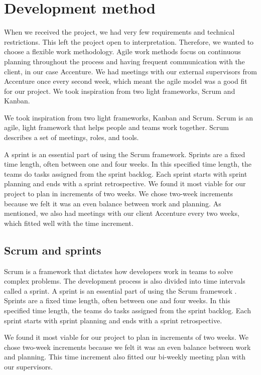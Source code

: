 \section{Development method}
When we received the project, we had very few requirements and technical restrictions. This left the project open to interpretation. Therefore, we wanted to choose a flexible work methodology. Agile work methods focus on continuous planning throughout the process and having frequent communication with the client, in our case Accenture. We had meetings with our external supervisors from Accenture once every second week, which meant the agile model was a good fit for our project. We took inspiration from two light frameworks, Scrum and Kanban.

We took inspiration from two light frameworks, Kanban and Scrum. Scrum is an agile,  light framework that helps people and teams work together. Scrum describes a set of meetings, roles, and tools. 

A sprint is an essential part of using the Scrum framework. Sprints are a fixed time length, often between one and four weeks. In this specified time length, the teams do tasks assigned from the sprint backlog. Each sprint starts with sprint planning and ends with a sprint retrospective. We found it most viable for our project to plan in increments of two weeks. We chose two-week increments because we felt it was an even balance between work and planning. As mentioned, we also had meetings with our client Accenture every two weeks, which fitted well with the time increment.   

\subsection{Scrum and sprints}
Scrum is a framework that dictates how developers work in teams to solve complex problems. The development process is also divided into time intervals called a sprint. A sprint is an essential part of using the Scrum framework \parencite{prosjektveilederen}. Sprints are a fixed time length, often between one and four weeks. In this specified time length, the teams do tasks assigned from the sprint backlog. Each sprint starts with sprint planning and ends with a sprint retrospective.

We found it most viable for our project to plan in increments of two weeks. We chose two-week increments because we felt it was an even balance between work and planning. This time increment also fitted our bi-weekly meeting plan with our supervisors.

